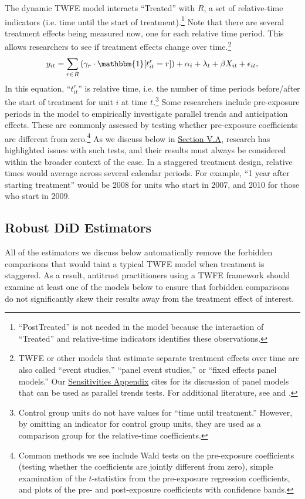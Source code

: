 \documentclass[12pt]{article}
\begin{document}
The dynamic TWFE model interacts ``Treated'' with $R$, a set of relative-time indicators (i.e. time until the start of treatment).\footnote{``PostTreated'' is not needed in the model because the interaction of ``Treated'' and relative-time indicators identifies these observations.} Note that there are several treatment effects being measured now, one for each relative time period. This allows researchers to see if treatment effects change over time.\footnote{TWFE or other models that estimate separate treatment effects over time are also called ``event studies,'' ``panel event studies,'' or ``fixed effects panel models.'' Our \hyperref[sec:appendixa]{Sensitivities Appendix} cites \citet{ruttenauer2023fixed} for its discussion of panel models that can be used as parallel trends tests. For additional literature, see \citet{freyaldenhoven2019pre} and \citet{schmidheiny2023event}.}
\begin{equation}
    y_{it} = \sum_{r\in R}\left(\gamma_r\cdot\mathbbm{1}[t^r_{it}=r]\right) + \alpha_i + \lambda_t + \beta X_{it} + \epsilon_{it},    
\end{equation}
In this equation, “$t^r_{it}$” is relative time, i.e. the number of time periods before/after the start of treatment for unit $i$ at time $t$.\footnote{Control group units do not have values for ``time until treatment.'' However, by omitting an indicator for control group units, they are used as a comparison group for the relative-time coefficients.} Some researchers include pre-exposure periods in the model to empirically investigate parallel trends and anticipation effects. These are commonly assessed by testing whether pre-exposure coefficients are different from zero.\footnote{Common methods we see include Wald tests on the pre-exposure coefficients (testing whether the coefficients are jointly different from zero), simple examination of the $t$-statistics from the pre-exposure regression coefficients, and plots of the pre- and post-exposure coefficients with confidence bands.} As we discuss below in \hyperref[sec:parallel-trends]{Section V.A}, research has highlighted issues with such tests, and their results must always be considered within the broader context of the case. In a staggered treatment design, relative times would average across several calendar periods. For example, “1 year after starting treatment” would be 2008 for units who start in 2007, and 2010 for those who start in 2009.
\subsection{Robust DiD Estimators}
All of the estimators we discuss below automatically remove the forbidden comparisons that would taint a typical TWFE model when treatment is staggered. As a result, antitrust practitioners using a TWFE framework should examine at least one of the models below to ensure that forbidden comparisons do not significantly skew their results away from the treatment effect of interest.
\end{document}
